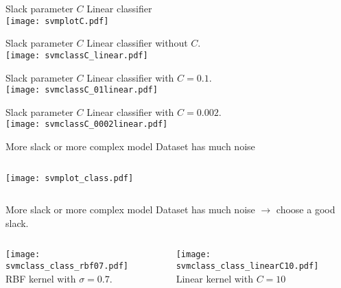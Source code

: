 \documentclass[unknownkeysallowed,10pt]{beamer}
\theoremstyle{definition} \newtheorem{rem}[thm]{Remark} \newtheorem*{rem*}{Remark}
\begin{document}
\begin{frame}{Slack parameter $C$}
\vskip6pt
Linear classifier\\
\centering
\texttt{[image: svmplotC.pdf]}
\end{frame}

\begin{frame}[noframenumbering]{Slack parameter $C$}
\vskip6pt
Linear classifier without $C$.\\
\centering
\texttt{[image: svmclassC\_linear.pdf]}
\end{frame}

\begin{frame}[noframenumbering]{Slack parameter $C$}
\vskip6pt
Linear classifier with $C = 0.1$.\\
\centering
\texttt{[image: svmclassC\_01linear.pdf]}
\end{frame}

\begin{frame}[noframenumbering]{Slack parameter $C$}
\vskip6pt
Linear classifier with $C = 0.002$.\\
\centering
\texttt{[image: svmclassC\_0002linear.pdf]}
\end{frame}


\begin{frame}{More slack or more complex model}
\vskip6pt
Dataset has much noise\\
\begin{columns}
\begin{column}{.5\textwidth}
\centering
\texttt{[image: svmplot\_class.pdf]}
\end{column}
\begin{column}{.5\textwidth}

\end{column}
\end{columns}
\end{frame}

\begin{frame}[noframenumbering]{More slack or more complex model}
\vskip6pt
Dataset has much noise $\rightarrow$ choose a good slack.\\
\begin{columns}
\begin{column}{.5\textwidth}
\centering
\texttt{[image: svmclass\_class\_rbf07.pdf]}\\
RBF kernel with $\sigma = 0.7$.
\end{column}
\begin{column}{.5\textwidth}
\centering
\texttt{[image: svmclass\_class\_linearC10.pdf]}\\
Linear kernel with $C = 10$
\end{column}
\end{columns}
\end{frame}
\end{document}
